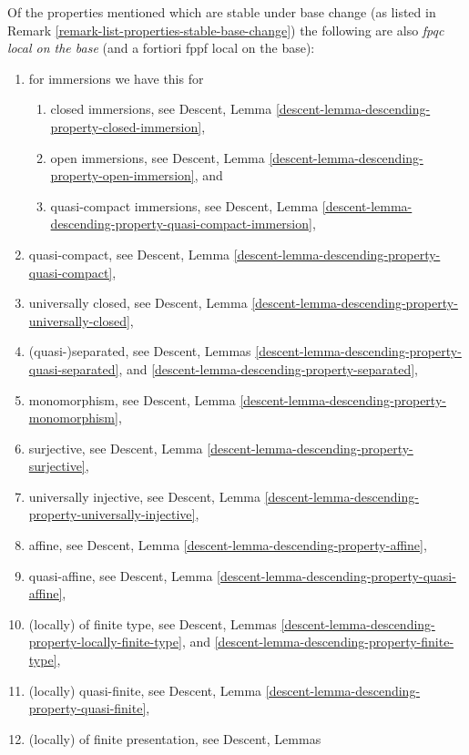\begin{remark}
\label{remark-list-properties-fpqc-local-base}
Of the properties mentioned which are stable under base change
(as listed in Remark \ref{remark-list-properties-stable-base-change})
the following are also {\it fpqc local on the base}
(and a fortiori fppf local on the base):
\begin{enumerate}
\item for immersions we have this for
\begin{enumerate}
\item closed immersions, see
Descent, Lemma \ref{descent-lemma-descending-property-closed-immersion},
\item open immersions, see
Descent, Lemma \ref{descent-lemma-descending-property-open-immersion}, and
\item quasi-compact immersions, see
Descent,
Lemma \ref{descent-lemma-descending-property-quasi-compact-immersion},
\end{enumerate}
\item quasi-compact, see
Descent, Lemma \ref{descent-lemma-descending-property-quasi-compact},
\item universally closed, see
Descent, Lemma
\ref{descent-lemma-descending-property-universally-closed},
\item (quasi-)separated, see
Descent, Lemmas
\ref{descent-lemma-descending-property-quasi-separated}, and
\ref{descent-lemma-descending-property-separated},
\item monomorphism, see
Descent, Lemma \ref{descent-lemma-descending-property-monomorphism},
\item surjective, see
Descent, Lemma \ref{descent-lemma-descending-property-surjective},
\item universally injective, see
Descent, Lemma \ref{descent-lemma-descending-property-universally-injective},
\item affine, see
Descent, Lemma \ref{descent-lemma-descending-property-affine},
\item quasi-affine, see
Descent, Lemma \ref{descent-lemma-descending-property-quasi-affine},
\item (locally) of finite type, see
Descent,
Lemmas \ref{descent-lemma-descending-property-locally-finite-type}, and
\ref{descent-lemma-descending-property-finite-type},
\item (locally) quasi-finite, see
Descent, Lemma \ref{descent-lemma-descending-property-quasi-finite},
\item (locally) of finite presentation, see
Descent, Lemmas

\end{enumerate}
\end{remark}
